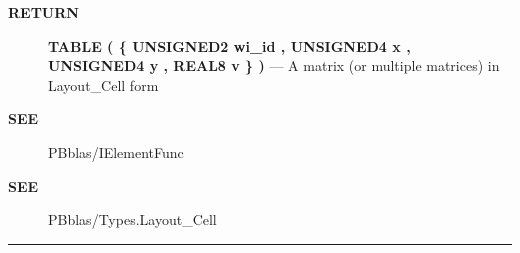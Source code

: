 \par
\begin{description}
\item [\colorbox{tagtype}{\color{white} \textbf{\textsf{RETURN}}}] \textbf{TABLE ( \{ UNSIGNED2 wi\_id , UNSIGNED4 x , UNSIGNED4 y , REAL8 v \} )} --- A matrix (or multiple matrices) in Layout\_Cell form
\end{description}






\par
\begin{description}
\item [\colorbox{tagtype}{\color{white} \textbf{\textsf{SEE}}}] PBblas/IElementFunc
\item [\colorbox{tagtype}{\color{white} \textbf{\textsf{SEE}}}] PBblas/Types.Layout\_Cell
\end{description}




\rule{\linewidth}{0.5pt}
